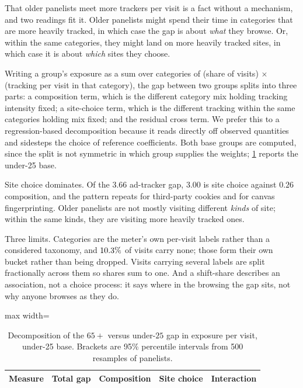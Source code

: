 \documentclass[12pt, letterpaper]{article}
\begin{document}
That older panelists meet more trackers per visit is a fact without a mechanism, and two readings fit it. Older panelists might spend their time in categories that are more heavily tracked, in which case the gap is about \textit{what} they browse. Or, within the same categories, they might land on more heavily tracked sites, in which case it is about \textit{which} sites they choose.  

Writing a group's exposure as a sum over categories of (share of visits) $\times$ (tracking per visit in that category), the gap between two groups splits into three parts: a composition term, which is the different category mix holding tracking intensity fixed; a site-choice term, which is the different tracking within the same categories holding mix fixed; and the residual cross term. We prefer this to a regression-based decomposition because it reads directly off observed quantities and sidesteps the choice of reference coefficients. Both base groups are computed, since the split is not symmetric in which group supplies the weights; \cref{tab:age_gap_decomposition} reports the under-25 base.
 
Site choice dominates. Of the $3.66$ ad-tracker gap, $3.00$ is site choice against $0.26$ composition, and the pattern repeats for third-party cookies and for canvas fingerprinting. Older panelists are not mostly visiting different \textit{kinds} of site; within the same kinds, they are visiting more heavily tracked ones.
 
Three limits. Categories are the meter's own per-visit labels rather than a considered taxonomy, and $10.3\%$ of visits carry none; those form their own bucket rather than being dropped. Visits carrying several labels are split fractionally across them so shares sum to one. And a shift-share describes an association, not a choice process: it says where in the browsing the gap sits, not why anyone browses as they do.

\begin{table}[ht]
\centering
\caption{Decomposition of the $65+$ versus under-$25$ gap in exposure per visit, under-25 base. Brackets are 95\% percentile intervals from 500 resamples of panelists.}
\label{tab:age_gap_decomposition}
\begin{adjustbox}{max width=\textwidth}
\begin{tabular}{lrrrr}
\toprule
Measure & Total gap & Composition & Site choice & Interaction \\
\midrule

\bottomrule
\end{tabular}
\end{adjustbox}
\end{table}
\end{document}
